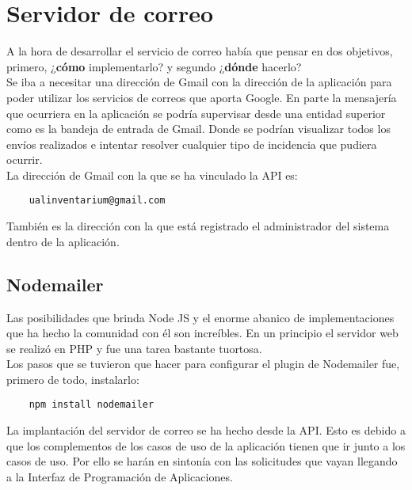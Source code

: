 \section{Servidor de correo}
A la hora de desarrollar el servicio de correo había que pensar en dos objetivos, primero, ¿\textbf{cómo} implementarlo? y segundo ¿\textbf{dónde} hacerlo?
\\Se iba a necesitar una dirección de Gmail con la dirección de la aplicación para poder utilizar los servicios de correos que aporta Google. En parte la mensajería que ocurriera en la aplicación se podría supervisar desde una entidad superior como es la bandeja de entrada de Gmail. Donde se podrían visualizar todos los envíos realizados e intentar resolver cualquier tipo de incidencia que pudiera ocurrir.
\\La dirección de Gmail con la que se ha vinculado la API es:
\begin{verbatim}
    ualinventarium@gmail.com
\end{verbatim}
También es la dirección con la que está registrado el administrador del sistema dentro de la aplicación.

\subsection{Nodemailer}
Las posibilidades que brinda Node JS y el enorme abanico de implementaciones que ha hecho la comunidad con él son increíbles. En un principio el servidor web se realizó en PHP y fue una tarea bastante tuortosa.
\\Los pasos que se tuvieron que hacer para configurar el plugin de Nodemailer \cite{nodemailer} fue, primero de todo, instalarlo:
\begin{verbatim}
    npm install nodemailer
\end{verbatim}
La implantación del servidor de correo se ha hecho desde la API. Esto es debido a que los complementos de los casos de uso de la aplicación tienen que ir junto a los casos de uso. Por ello se harán en sintonía con las solicitudes que vayan llegando a la Interfaz de Programación de Aplicaciones.


